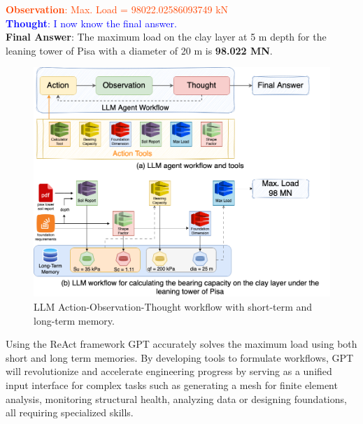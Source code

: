 \documentclass[12pt]{article}
\begin{document}
\noindent\textcolor{OrangeRed}{\textbf{Observation}: Max. Load = 98022.02586093749 kN}\\

\noindent \textcolor{blue}{\textbf{Thought}: I now know the final answer.}\\

\noindent \textcolor{BrickRed}{\textbf{Final Answer}: The maximum load on the clay layer at 5 m depth for the leaning tower of Pisa with a diameter of 20 m is \textbf{98.022 MN}.\\}

\begin{figure}[!htbp]
    \centering
    \includegraphics[width=\textwidth]{figs/llm-agent-workflow.png}
    \caption{LLM Action-Observation-Thought workflow with short-term and long-term memory.}
    \label{fig:llm-workflow}
\end{figure}


\noindent Using the ReAct framework GPT accurately solves the maximum load using both short and long term memories. By developing tools to formulate workflows, GPT will revolutionize and accelerate engineering progress by serving as a unified input interface for complex tasks such as generating a mesh for finite element analysis, monitoring structural health, analyzing data or designing foundations, all requiring specialized skills. 
\end{document}
